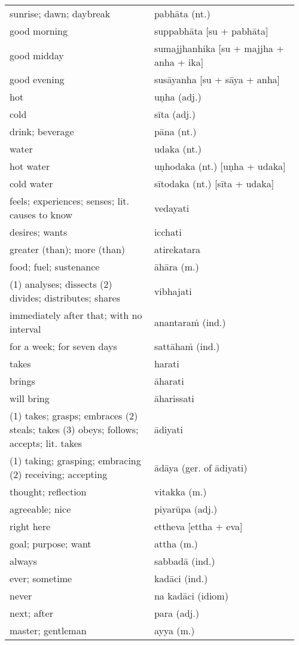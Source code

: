\documentclass[a5paper]{memoir}
\begin{document}
\begin{longtable}{L{0.48\linewidth} L{0.48\linewidth}}
sunrise; dawn; daybreak & pabhāta (nt.)\\[0pt]
good morning & suppabhāta [su + pabhāta]\\[0pt]
good midday & sumajjhanhika [su + majjha + anha + ika]\\[0pt]
good evening & susāyanha [su + sāya + anha]\\[0pt]
hot & uṇha (adj.)\\[0pt]
cold & sīta (adj.)\\[0pt]
drink; beverage & pāna (nt.)\\[0pt]
water & udaka (nt.)\\[0pt]
hot water & uṇhodaka (nt.) [uṇha + udaka]\\[0pt]
cold water & sītodaka (nt.) [sīta + udaka]\\[0pt]
feels; experiences; senses; lit. causes to know & vedayati\\[0pt]
desires; wants & icchati\\[0pt]
greater (than); more (than) & atirekatara\\[0pt]
food; fuel; sustenance & āhāra (m.)\\[0pt]
(1) analyses; dissects (2) divides; distributes; shares & vibhajati\\[0pt]
immediately after that; with no interval & anantaraṁ (ind.)\\[0pt]
for a week; for seven days & sattāhaṁ (ind.)\\[0pt]
takes & harati\\[0pt]
brings & āharati\\[0pt]
will bring & āharissati\\[0pt]
(1) takes; grasps; embraces (2) steals; takes (3) obeys; follows; accepts; lit. takes & ādiyati\\[0pt]
(1) taking; grasping; embracing (2) receiving; accepting & ādāya (ger. of ādiyati)\\[0pt]
thought; reflection & vitakka (m.)\\[0pt]
agreeable; nice & piyarūpa (adj.)\\[0pt]
right here & ettheva [ettha + eva]\\[0pt]
goal; purpose; want & attha (m.)\\[0pt]
always & sabbadā (ind.)\\[0pt]
ever; sometime & kadāci (ind.)\\[0pt]
never & na kadāci (idiom)\\[0pt]
next; after & para (adj.)\\[0pt]
master; gentleman & ayya (m.)\\[0pt]

\end{longtable}
\end{document}
